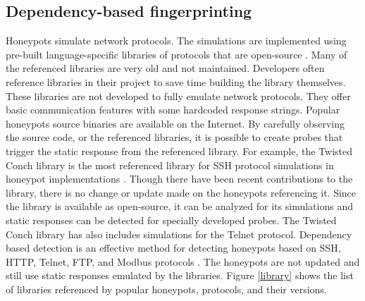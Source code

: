 \subsection{Dependency-based fingerprinting}
Honeypots simulate network protocols. The simulations are  implemented using pre-built language-specific libraries of protocols that are open-source . Many of the referenced libraries are very old and not maintained. Developers often reference libraries in their project to save time building the library themselves. These libraries are not developed to fully emulate network protocols. They offer basic communication features with some hardcoded response strings. Popular honeypots source binaries are available on the Internet. By carefully observing the source code, or the referenced libraries, it is possible to create probes that trigger the static response from the referenced library. For example, the Twisted Conch \cite{twisted}  library is the most referenced library for SSH protocol simulations in honeypot implementations \cite{counting}. Though there have been recent contributions to the library, there is no change or update made on the honeypots referencing it. Since the library is available as open-source, it can be analyzed for its simulations and static responses can be detected for specially developed probes. The Twisted Conch library has also includes  simulations for the Telnet protocol. Dependency based detection is an effective method for detecting honeypots based on SSH, HTTP, Telnet, FTP, and Modbus protocols . The honeypots are not updated and still use static responses emulated by the libraries. Figure \ref{library}  \cite{Vetterl2018} shows the list of libraries referenced by popular honeypots, protocols, and their versions. 



